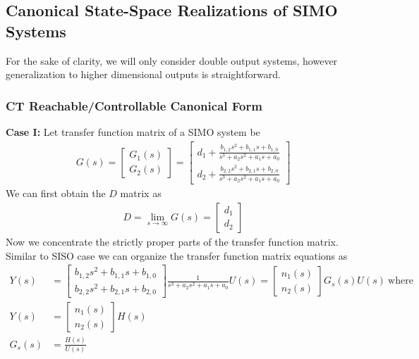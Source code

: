 \documentclass[twoside]{article}
\begin{document}
\subsection{Canonical State-Space Realizations of SIMO Systems}

For the sake of clarity, we will only consider double output systems, however generalization to higher dimensional outputs is straightforward. 

\subsubsection{CT Reachable/Controllable Canonical Form}

\textbf{Case I:} Let transfer function matrix of a SIMO system be 
%
\begin{align*}
	G(s) = \left[ \begin{array}{c} G_1(s) \\ G_2(s) \end{array} \right] =
	       \left[ \begin{array}{cc} d_{1} + \frac{ b_{1,2} s^2  + b_{1,1} s + b_{1,0} }{ s^3 + a_2 s^2 + a_1 s + a_0}  
	       \\ d_{2} + \frac{ b_{2,2} s^2  + b_{2,1} s + b_{2,0} }{ s^3 + a_2 s^2 + a_1 s + a_0}   \end{array} \right]
\end{align*}
%
We can first obtain the $D$ matrix as
%
\begin{align*}
	D = \lim_{s \to \infty} G(s) = \left[ \begin{array}{c} d_1 \\  d_2 \end{array} \right]
\end{align*}
%
Now we concentrate the strictly proper parts of the transfer function matrix. 
Similar to SISO case we can organize the transfer function matrix equations as
%
\begin{align*}
Y(s) &=  \left[ \begin{array}{cc} b_{1,2} s^2  + b_{1,1} s + b_{1,0} 
	       \\  b_{2,2} s^2  + b_{2,1} s + b_{2,0}   \end{array} \right]
\frac{1}{ s^3 + a_2 s^2 + a_1 s + a_0 } U(s) 
= \left[ \begin{array}{c} n_1(s) \\ n_2(s) \end{array} \right] G_s(s) U(s) \ \mathrm{where} 
\\
Y(s) &= \left[ \begin{array}{c} n_1(s) \\ n_2(s) \end{array} \right] H(s) 
\\
G_s(s) &= \frac{H(s)}{U(s)} 
\end{align*}
\end{document}
